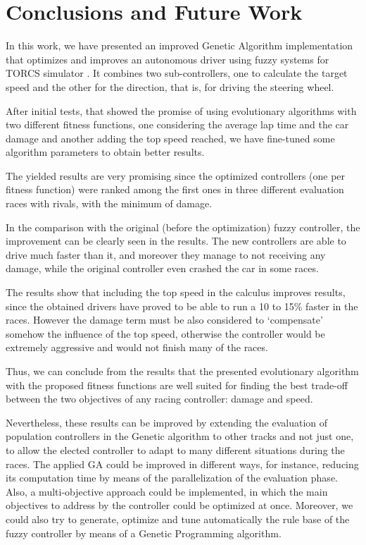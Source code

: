 \documentclass[conference]{IEEEtran}
\begin{document}
\section{Conclusions and Future Work} 
\label{sec:conclusions}

In this work, we have presented an improved Genetic Algorithm implementation that optimizes and improves an autonomous driver using fuzzy systems for TORCS simulator \cite{evo17}. It combines two sub-controllers, one to calculate the target speed and the other for the direction, that is, for driving the steering wheel.

After initial tests, that showed the promise of using evolutionary algorithms with two different fitness functions, one considering the average lap time and the car damage and another adding the top speed reached, we have fine-tuned some algorithm parameters to obtain better results. %

The yielded results are very promising since the optimized controllers (one per fitness function) were ranked among the first ones in three different evaluation races with rivals, with the minimum of damage.

In the comparison with the original (before the optimization) fuzzy controller, the improvement can be clearly seen in the results. The new controllers are able to drive much faster than it, and moreover they manage to not receiving any damage, while the original controller even crashed the car in some races.

The results show that including the top speed in the calculus improves
results, since the obtained drivers have proved to be able to run a 10
to 15\% faster in the races. However the damage term must be also
considered to `compensate' somehow the influence of the top speed,
otherwise the controller would be extremely aggressive and would not
finish many of the races.

Thus, we can conclude from the results that the presented evolutionary
algorithm with the
proposed fitness functions are well suited for finding the best
trade-off between the two objectives of any racing controller: damage
and speed. 

Nevertheless, these results can be improved by extending the
evaluation of population controllers in the Genetic algorithm to other
tracks and not just one, to allow the elected controller to adapt to many different situations during the races.
The applied GA could be improved in different ways, for instance, reducing its computation time by means of the parallelization of the evaluation phase.
Also, a multi-objective approach could be implemented, in which the main objectives to address by the controller could be optimized at once.
Moreover, we could also try to generate, optimize and tune
automatically the rule base of the fuzzy controller by means of a
Genetic Programming algorithm.  
\end{document}

